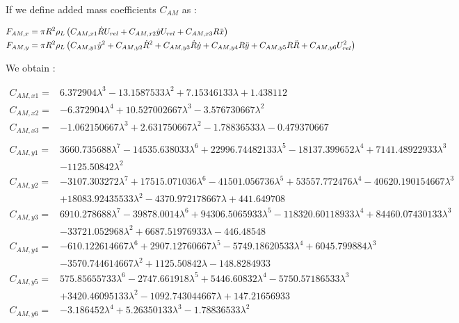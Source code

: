 If we define added mass coefficients $C_{AM}$ as :

\begin{align}
F_{AM,x}&=\pi R^{2}\rho_{L}\left( C_{AM,x1}\dot{R}U_{rel}+C_{AM,x2}\dot{y}U_{rel}+C_{AM,x3}R\ddot{x} \right)\\
F_{AM,y}&=\pi R^{2}\rho_{L}\left( C_{AM,y1}\dot{y}^{2}+C_{AM,y2}\dot{R}^{2}+C_{AM,y3}\dot{R}\dot{y}+C_{AM,y4}R\ddot{y} + C_{AM,y5}R\ddot{R}+C_{AM,y6}U_{rel}^{2} \right)
\end{align}

We obtain :

\begin{align}
C_{AM,x1}=&6.372904 \lambda^{3} - 13.1587533\lambda^{2} + 7.15346133\lambda + 1.438112\\
C_{AM,x2}=&-6.372904\lambda^{4}+10.527002667\lambda^{3}-3.576730667\lambda^{2}\\
C_{AM,x3}=&-1.062150667\lambda^{3} + 2.631750667\lambda^{2}-1.78836533\lambda-0.479370667\\
\nonumber \\
\nonumber C_{AM,y1}=& 3660.735688\lambda^{7} - 14535.638033\lambda^{6} + 22996.74482133\lambda^{5} - 18137.399652\lambda^{4} + 7141.48922933\lambda^{3}\\& - 1125.50842 \lambda^{2}\\
\nonumber C_{AM,y2}=&-3107.303272\lambda^{7} + 17515.071036\lambda^{6} - 41501.056736\lambda^{5} + 53557.772476 \lambda^{4} - 40620.190154667\lambda^{3} \\& + 18083.92435533\lambda^{2} - 4370.972178667\lambda + 441.649708\\
\nonumber C_{AM,y3}=&6910.278688 \lambda^7 - 39878.0014 \lambda^6 + 94306.5065933 \lambda^5 - 118320.60118933 \lambda^4 + 84460.07430133 \lambda^3\\ &- 33721.052968 \lambda^2 + 6687.51976933 \lambda - 446.48548 \\
\nonumber C_{AM,y4}=&-610.122614667 \lambda^6 + 2907.12760667 \lambda^5 - 5749.18620533 \lambda^4 + 6045.799884 \lambda^3 \\&- 3570.744614667 \lambda^2 + 1125.50842 \lambda - 148.8284933 \\
\nonumber C_{AM,y5}=&575.85655733 \lambda^6 - 2747.661918 \lambda^5 + 5446.60832 \lambda^4 - 5750.57186533 \lambda^3 \\& + 3420.46095133 \lambda^2 - 1092.743044667 \lambda + 147.21656933 \\
C_{AM,y6}=& -3.186452 \lambda^4 + 5.26350133 \lambda^3 - 1.78836533 \lambda^2\\
\end{align}


